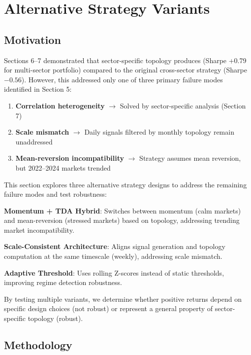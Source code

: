 \section{Alternative Strategy Variants}
\label{sec:variants}

\subsection{Motivation}

Sections 6--7 demonstrated that sector-specific topology produces \positiverisk{} (Sharpe +0.79 for multi-sector portfolio) compared to the original cross-sector strategy (Sharpe $-0.56$). However, this addressed only one of three primary failure modes identified in Section 5:

\begin{enumerate}
\item \checkmark \textbf{Correlation heterogeneity} $\rightarrow$ Solved by sector-specific analysis (Section 7)
\item \texttimes{} \textbf{Scale mismatch} $\rightarrow$ Daily signals filtered by monthly topology remain unaddressed
\item \texttimes{} \textbf{Mean-reversion incompatibility} $\rightarrow$ Strategy assumes mean reversion, but 2022--2024 markets trended
\end{enumerate}

This section explores three alternative strategy designs to address the remaining failure modes and test robustness:

\textbf{Momentum + TDA Hybrid}: Switches between momentum (calm markets) and mean-reversion (stressed markets) based on topology, addressing trending market incompatibility.

\textbf{Scale-Consistent Architecture}: Aligns signal generation and topology computation at the same timescale (weekly), addressing scale mismatch.

\textbf{Adaptive Threshold}: Uses rolling Z-scores instead of static thresholds, improving regime detection robustness.

By testing multiple variants, we determine whether positive returns depend on specific design choices (not robust) or represent a general property of sector-specific topology (robust).

\subsection{Methodology}

